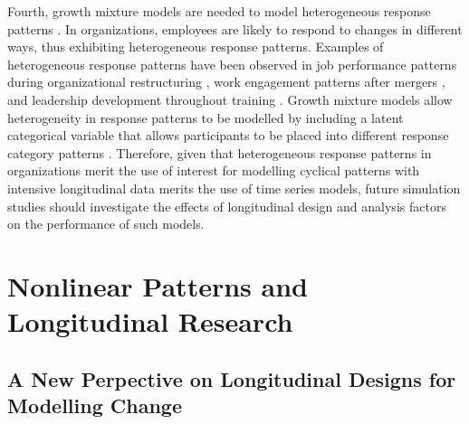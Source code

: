 \documentclass[
12pt, %
twoside,
english]{guelphthesis}
\begin{document}
Fourth, growth mixture models are needed to model heterogeneous response patterns \autocite{wang2007,vandernest2020}. In organizations, employees are likely to respond to changes in different ways, thus exhibiting heterogeneous response patterns. Examples of heterogeneous response patterns have been observed in job performance patterns during organizational restructuring \autocite{miraglia2015}, work engagement patterns after mergers \autocite{seppälä2018}, and leadership development throughout training \autocite{day2011}. Growth mixture models allow heterogeneity in response patterns to be modelled by including a latent categorical variable that allows participants to be placed into different response category patterns \autocite[cf.][]{bauer2007}. Therefore, given that heterogeneous response patterns in organizations merit the use of interest for modelling cyclical patterns with intensive longitudinal data merits the use of time series models, future simulation studies should investigate the effects of longitudinal design and analysis factors on the performance of such models.

\hypertarget{nonlinear-patterns-and-longitudinal-research}{%
\section{Nonlinear Patterns and Longitudinal Research}\label{nonlinear-patterns-and-longitudinal-research}}

\hypertarget{a-new-perpective-on-longitudinal-designs-for-modelling-change}{%
\subsection{A New Perpective on Longitudinal Designs for Modelling Change}\label{a-new-perpective-on-longitudinal-designs-for-modelling-change}}
\end{document}

